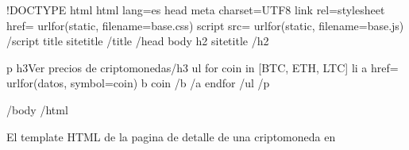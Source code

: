 \documentclass[a5paper,9pt,spanish]{sphinxmanual}
\begin{document}
\begin{sphinxVerbatim}[commandchars=\\\{\}]
\PYGZlt{}!DOCTYPE html\PYGZgt{}
\PYGZlt{}html lang=\PYGZdq{}es\PYGZdq{}\PYGZgt{}
\PYGZlt{}head\PYGZgt{}
    \PYGZlt{}meta charset=\PYGZdq{}UTF\PYGZhy{}8\PYGZdq{}\PYGZgt{}
    \PYGZlt{}link rel=\PYGZdq{}stylesheet\PYGZdq{} href=\PYGZsq{}\PYGZob{}\PYGZob{} url\PYGZus{}for(\PYGZdq{}static\PYGZdq{}, filename=\PYGZdq{}base.css\PYGZdq{}) \PYGZcb{}\PYGZcb{}\PYGZsq{}\PYGZgt{}
    \PYGZlt{}script src=\PYGZsq{}\PYGZob{}\PYGZob{} url\PYGZus{}for(\PYGZdq{}static\PYGZdq{}, filename=\PYGZdq{}base.js\PYGZdq{}) \PYGZcb{}\PYGZcb{}\PYGZsq{}\PYGZgt{}\PYGZlt{}/script\PYGZgt{}
    \PYGZlt{}title\PYGZgt{}\PYGZob{}\PYGZob{} site\PYGZus{}title \PYGZcb{}\PYGZcb{}\PYGZlt{}/title\PYGZgt{}
\PYGZlt{}/head\PYGZgt{}
\PYGZlt{}body\PYGZgt{}
    \PYGZlt{}h2\PYGZgt{}\PYGZob{}\PYGZob{} site\PYGZus{}title \PYGZcb{}\PYGZcb{}\PYGZlt{}/h2\PYGZgt{}

    \PYGZlt{}p\PYGZgt{}
    \PYGZlt{}h3\PYGZgt{}Ver precios de criptomonedas\PYGZlt{}/h3\PYGZgt{}
    \PYGZlt{}ul\PYGZgt{}
        \PYGZob{}\PYGZpc{} for coin in [\PYGZsq{}BTC\PYGZsq{}, \PYGZsq{}ETH\PYGZsq{}, \PYGZsq{}LTC\PYGZsq{}] \PYGZpc{}\PYGZcb{}
        \PYGZlt{}li\PYGZgt{}
        \PYGZlt{}a href=\PYGZdq{}\PYGZob{}\PYGZob{} url\PYGZus{}for(\PYGZsq{}datos\PYGZsq{}, symbol=coin) \PYGZcb{}\PYGZcb{}\PYGZdq{}\PYGZgt{}
            \PYGZlt{}b\PYGZgt{}\PYGZob{}\PYGZob{} coin \PYGZcb{}\PYGZcb{}\PYGZlt{}/b\PYGZgt{}
        \PYGZlt{}/a\PYGZgt{}
        \PYGZob{}\PYGZpc{} endfor \PYGZpc{}\PYGZcb{}
    \PYGZlt{}/ul\PYGZgt{}
    \PYGZlt{}/p\PYGZgt{}

\PYGZlt{}/body\PYGZgt{}
\PYGZlt{}/html\PYGZgt{}
\end{sphinxVerbatim}

\sphinxAtStartPar
El template HTML de la pagina de detalle de una criptomoneda en 
\end{document}
